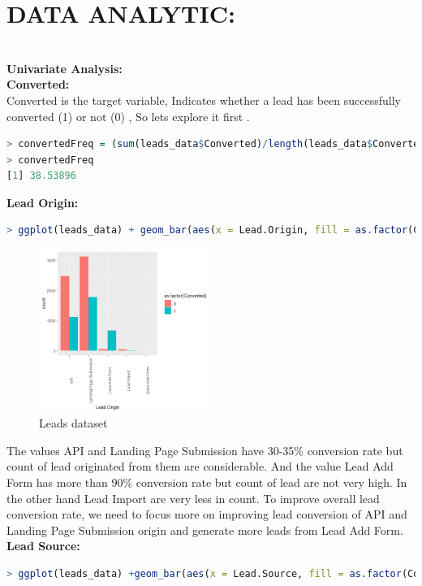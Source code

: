 \section{DATA ANALYTIC:}\\
\textbf{\large Univariate Analysis: }\\
\textbf{Converted: }\\
Converted is the target variable, Indicates whether a lead has been successfully converted (1) or not (0) , So lets explore it first .
\begin{lstlisting}[language=R]
> convertedFreq = (sum(leads_data$Converted)/length(leads_data$Converted))*100
> convertedFreq
[1] 38.53896
\end{lstlisting}
\textbf{Lead Origin: }
\begin{lstlisting}[language=R]
> ggplot(leads_data) + geom_bar(aes(x = Lead.Origin, fill = as.factor(Converted)), position = "dodge") + theme(axis.text.x = element_text(angle = 90))
\end{lstlisting}
\begin{figure}[H]
    \centering
    \includegraphics[width=0.5\textwidth]{assets/origin.png}
    \caption{ Leads dataset}
\end{figure}
The values API and Landing Page Submission have 30-35\% conversion rate but count of lead originated from them are considerable.
And the value Lead Add Form has more than 90\% conversion rate but count of lead are not very high.
In the other hand Lead Import are very less in count.
To improve overall lead conversion rate, we need to focus more on improving lead conversion of API and Landing Page Submission origin and generate more leads from Lead Add Form.
\textbf{Lead Source: }
\begin{lstlisting}[language=R]
> ggplot(leads_data) +geom_bar(aes(x = Lead.Source, fill = as.factor(Converted)), position = "dodge") + theme(axis.text.x = element_text(angle = 90))
\end{lstlisting}
